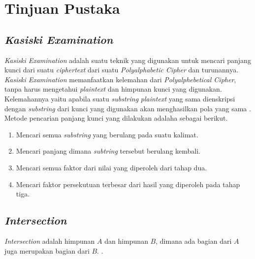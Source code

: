 
\section{Tinjuan Pustaka}

\subsection{\textit{Kasiski Examination}}
\textit{Kasiski Examination} adalah suatu teknik yang digunakan untuk mencari panjang kunci dari suatu \textit{ciphertext} dari suatu \textit{Polyalphabetic Cipher} dan turunannya. \textit{Kasiski Examination}  memanfaatkan kelemahan dari \textit{Polyalphebetical Cipher}, tanpa harus mengetahui \textit{plaintext} dan himpunan kunci yang digunakan. Kelemahannya yaitu apabila suatu \textit{substring} \textit{plaintext} yang sama dienskripsi dengan \textit{substring} dari kunci yang digunakan akan menghasilkan pola yang sama \cite{noauthor_kasiski_nodate}. Metode pencarian panjang kunci yang dilakukan adalaha sebagai berikut.
\begin{enumerate}
\item Mencari semua \textit{substring} yang berulang pada suatu kalimat.
\item Mencari panjang dimana \textit{subtring} tersebut berulang kembali.
\item Mencari semua faktor dari nilai yang diperoleh dari tahap dua.
\item Mencari faktor persekutuan terbesar dari hasil yang diperoleh pada tahap tiga.
\end{enumerate}


\subsection{\textit{Intersection}}
\textit{Intersection} adalah himpunan $A$ dan himpunan $B$, dimana ada bagian dari $A$ juga merupakan bagian dari $B$. \cite{devlin_joy_1993}.

